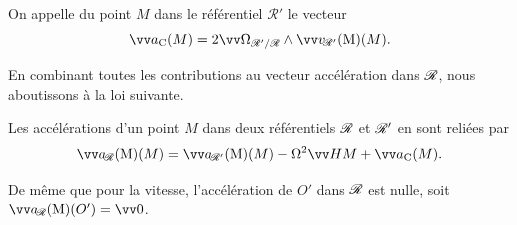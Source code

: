 \documentclass[12pt,fancy]{cours}
\begin{document}
\begin{definition}\label{def:ae}
On appelle  du point $M$ dans le référentiel $\mathcal{R'}$ le vecteur
\begin{equation*}
\aC  = 2\OR \pv  \vRp(M).
\end{equation*}
\end{definition}

En combinant toutes les contributions au vecteur accélération dans $\mathcal{R}$, nous aboutissons à la loi suivante.
\begin{theorem}\label{form:compoa}
Les accélérations d'un point $M$ dans deux référentiels $\mathcal{R}$ et $\mathcal{R}'$  en  sont reliées par
\begin{equation*}
\aR(M) =  \aRp(M) -\Omega^{2} \Vec{HM}  +\aC.
\end{equation*}
\end{theorem}

\noindent De même que pour la vitesse, l'accélération de $O'$ dans $\mathcal{R}$ est nulle, soit $\aR(O')=\Vec{0}$.

\end{document}
